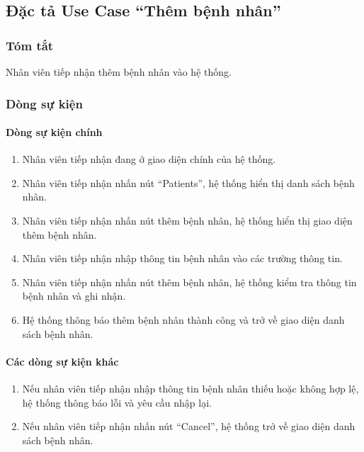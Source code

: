 \subsection{Đặc tả Use Case ``Thêm bệnh nhân''}

\subsubsection{Tóm tắt}
Nhân viên tiếp nhận thêm bệnh nhân vào hệ thống.

\subsubsection{Dòng sự kiện}
\paragraph{\textbf{Dòng sự kiện chính}}
\begin{enumerate}
  \item Nhân viên tiếp nhận đang ở giao diện chính của hệ thống.
  \item Nhân viên tiếp nhận nhấn nút ``Patients'', hệ thống hiển thị danh sách bệnh nhân.
  \item Nhân viên tiếp nhận nhấn nút thêm bệnh nhân, hệ thống hiển thị giao diện thêm bệnh nhân.
  \item Nhân viên tiếp nhận nhập thông tin bệnh nhân vào các trường thông tin.
  \item Nhân viên tiếp nhận nhấn nút thêm bệnh nhân, hệ thống kiểm tra thông tin bệnh nhân và ghi nhận.
  \item Hệ thống thông báo thêm bệnh nhân thành công và trở về giao diện danh sách bệnh nhân.
\end{enumerate}

\paragraph{\textbf{Các dòng sự kiện khác}}
\begin{enumerate}
  \item Nếu nhân viên tiếp nhận nhập thông tin bệnh nhân thiếu hoặc không hợp lệ, hệ thống thông báo lỗi và yêu cầu nhập lại.
  \item Nếu nhân viên tiếp nhận nhấn nút ``Cancel'', hệ thống trở về giao diện danh sách bệnh nhân.
\end{enumerate}

